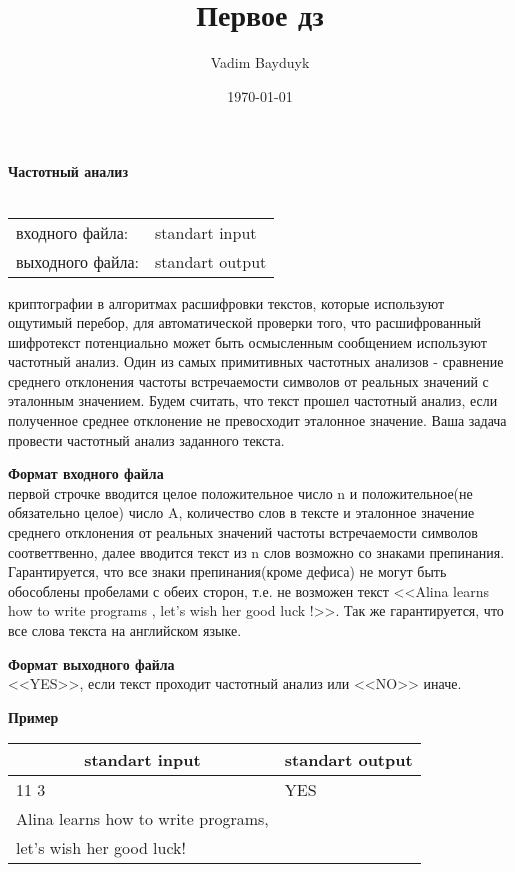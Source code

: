 \documentclass[10pt, a4paper]{article}
\title{Первое дз}
\author{Vadim Bayduyk}
\date{\today}
\begin{document}
{\selectfont
\noindent\LARGE\textbf{Частотный анализ}\\\\
\normalsize
\begin{tabular}{ll}
 входного файла: & standart input\\
 выходного файла: & standart output\\
\end{tabular}

 криптографии в алгоритмах расшифровки текстов, которые используют ощутимый перебор, для автоматической проверки того, что расшифрованный шифротекст потенциально может быть осмысленным сообщением используют частотный анализ. Один из самых примитивных частотных анализов  - сравнение среднего отклонения частоты встречаемости символов от реальных значений с эталонным значением. Будем считать, что текст прошел частотный анализ, если полученное среднее отклонение не превосходит эталонное значение. Ваша задача  провести частотный анализ заданного текста.

\noindent\large\textbf{Формат входного файла}\\
 первой строчке вводится целое положительное число n и положительное(не обязательно целое) число A, количество слов в тексте и эталонное значение среднего отклонения от реальных значений частоты встречаемости символов соответтвенно, далее вводится текст из n слов возможно со знаками препинания. Гарантируется, что все знаки препинания(кроме дефиса) не могут быть обособлены пробелами с обеих сторон, т.е. не возможен текст <<Alina learns how to write programs  , let's wish her good luck !>>. Так же гарантируется, что все слова текста на английском языке. 

\noindent\large\textbf{Формат выходного файла}\\ <<YES>>, если текст проходит частотный анализ или <<NO>> иначе.

\noindent\large\textbf{Пример}\normalsize

\noindent\begin{tabular}{|p{}|p{}|}
\hline
\multicolumn{1}{|c|}{standart input} & \multicolumn{1}{c|}{standart output}\\\hline
 11 3 & YES \\
 Alina learns how to write programs, & \\
let's wish her good luck! &\\\hline
\end{tabular}

}
\end{document}
